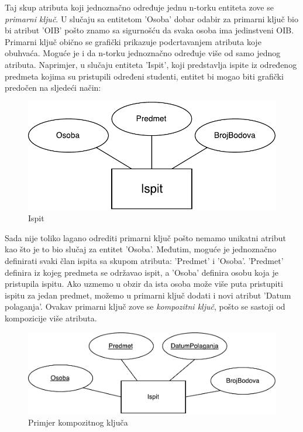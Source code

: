 \documentclass[times, utf8, zavrsni]{fer}
\begin{document}
Taj skup atributa koji jednoznačno određuje jednu n-torku entiteta zove se \emph{primarni ključ}. U slučaju sa entitetom 'Osoba' dobar odabir za primarni ključ bio bi atribut 'OIB' pošto znamo sa sigurnošću da svaka osoba ima jedinstveni OIB. Primarni ključ obično se grafički prikazuje podcrtavanjem atributa koje obuhvaća. Moguće je i da n-torku jednoznačno određuje više od samo jednog atributa. Naprimjer, u slučaju entiteta 'Ispit', koji predstavlja ispite iz određenog predmeta kojima su pristupili određeni studenti, entitet bi mogao biti grafički predočen na sljedeći način:\\

\begin{figure}[H]
\centering
\includegraphics[scale=0.8]{img/ispit.pdf}
\caption{Ispit}
\label{fig:ispit}
\end{figure}
\clearpage

Sada nije toliko lagano odrediti primarni ključ pošto nemamo unikatni atribut kao što je to bio slučaj za entitet 'Osoba'. Međutim, moguće je jednoznačno definirati svaki član ispita sa skupom atributa: 'Predmet' i 'Osoba'. 'Predmet' definira iz kojeg predmeta se održavao ispit, a 'Osoba' definira osobu koja je pristupila ispitu. Ako uzmemo u obzir da ista osoba može više puta pristupiti ispitu za jedan predmet, možemo u primarni ključ dodati i novi atribut 'Datum polaganja'. Ovakav primarni ključ zove se \emph{kompozitni ključ}, pošto se sastoji od kompozicije više atributa.\\

\begin{figure}[H]
\centering
\includegraphics[scale=0.8]{img/kom-ispit.pdf}
\caption{Primjer kompozitnog ključa}
\label{fig:kom-ispit}
\end{figure}
\end{document}
